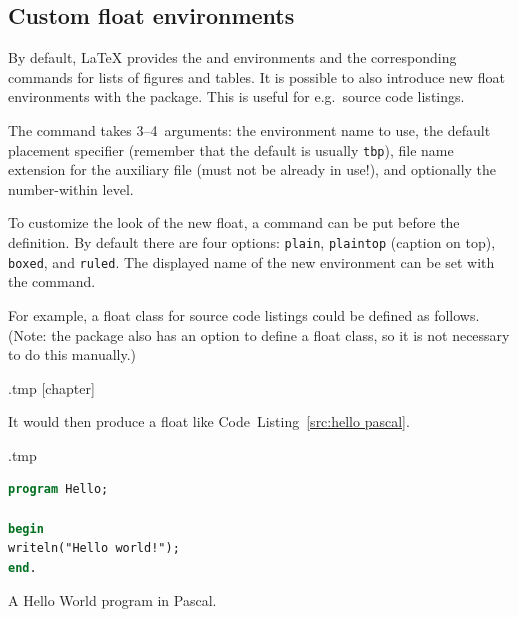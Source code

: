 


%
%
\subsection{Custom float environments}\label{sec:custom floats}

By default, \LaTeX{} provides the  and  environments
and the corresponding commands for lists of figures and tables.
It is possible to also introduce new float environments with the  package.
This is useful for e.g.\ source code listings.

The  command takes 3--4~arguments:
the environment name to use,
the default placement specifier (remember that the default is usually \verb|tbp|),
file name extension for the auxiliary file (must not be already in use!),
and optionally the number-within level.

To customize the look of the new float,
a  command can be put before the definition.
By default there are four options: \verb|plain|, \verb|plaintop| (caption on top),
\verb|boxed|, and \verb|ruled|.
The displayed name of the new environment can be set with the  command.

For example, a float class for source code listings could be defined as follows.
(Note: the  package also has an option to define a float class,
so it is not necessary to do this manually.)
%
\begin{VerbatimOut}{\jobname.tmp}
[chapter]
\end{VerbatimOut}
\ExecuteExample  

It would then produce a float like Code~Listing~\ref{src:hello pascal}.
%
\begin{VerbatimOut}{\jobname.tmp}
\begin{sourcecode}[h]
\begin{lstlisting}[language=Pascal]
program Hello;

begin
writeln("Hello world!");
end.
\end{lstlisting}
\caption{A Hello World program in Pascal.}
\label{src:hello pascal}
\end{sourcecode}
\end{VerbatimOut}
\ExecuteExample



%
%
%
